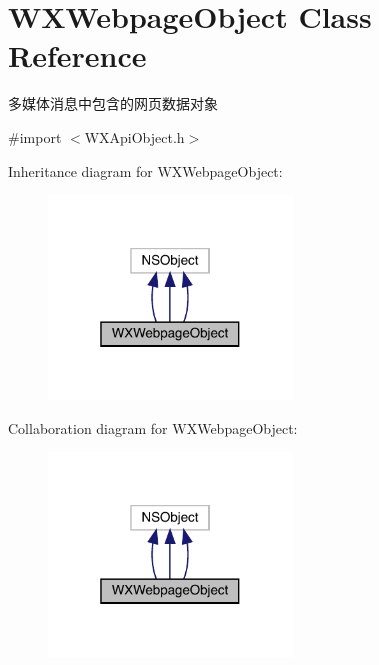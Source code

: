 \hypertarget{interface_w_x_webpage_object}{}\section{W\+X\+Webpage\+Object Class Reference}
\label{interface_w_x_webpage_object}


多媒体消息中包含的网页数据对象  




{\ttfamily \#import $<$W\+X\+Api\+Object.\+h$>$}



Inheritance diagram for W\+X\+Webpage\+Object\+:\nopagebreak
\begin{figure}[H]
\begin{center}
\leavevmode
\includegraphics[width=184pt]{interface_w_x_webpage_object__inherit__graph}
\end{center}
\end{figure}


Collaboration diagram for W\+X\+Webpage\+Object\+:\nopagebreak
\begin{figure}[H]
\begin{center}
\leavevmode
\includegraphics[width=184pt]{interface_w_x_webpage_object__coll__graph}
\end{center}
\end{figure}
